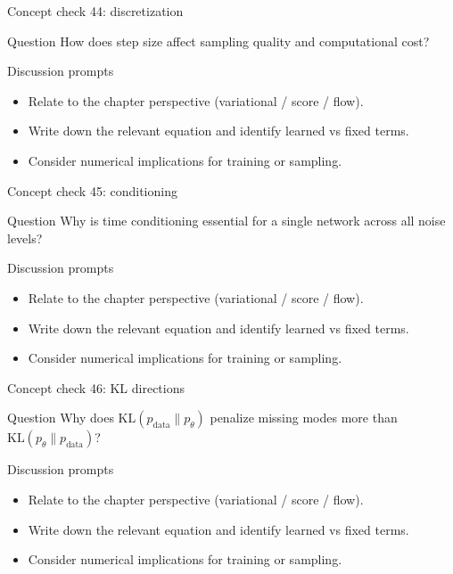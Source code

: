 \documentclass[aspectratio=169]{beamer}
\begin{document}
\begin{frame}{Concept check 44: discretization}
\begin{block}{Question}
How does step size affect sampling quality and computational cost?
\end{block}
\begin{block}{Discussion prompts}
\begin{itemize}
\item Relate to the chapter perspective (variational / score / flow).
\item Write down the relevant equation and identify learned vs fixed terms.
\item Consider numerical implications for training or sampling.
\end{itemize}
\end{block}
\end{frame}

\begin{frame}{Concept check 45: conditioning}
\begin{block}{Question}
Why is time conditioning essential for a single network across all noise levels?
\end{block}
\begin{block}{Discussion prompts}
\begin{itemize}
\item Relate to the chapter perspective (variational / score / flow).
\item Write down the relevant equation and identify learned vs fixed terms.
\item Consider numerical implications for training or sampling.
\end{itemize}
\end{block}
\end{frame}

\begin{frame}{Concept check 46: KL directions}
\begin{block}{Question}
Why does \(\mathrm{KL}(p_{\text{data}}\|p_\theta)\) penalize missing modes more than \(\mathrm{KL}(p_\theta\|p_{\text{data}})\)?
\end{block}
\begin{block}{Discussion prompts}
\begin{itemize}
\item Relate to the chapter perspective (variational / score / flow).
\item Write down the relevant equation and identify learned vs fixed terms.
\item Consider numerical implications for training or sampling.
\end{itemize}
\end{block}
\end{frame}
\end{document}
